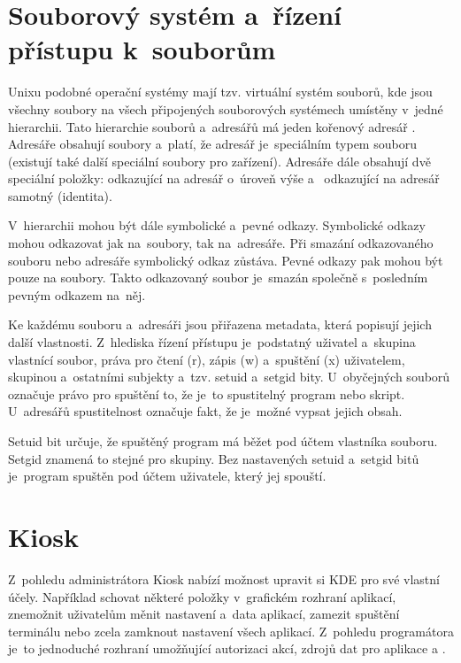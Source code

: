 \section{Souborový systém a~řízení přístupu k~souborům}
Unixu podobné operační systémy mají tzv. virtuální systém souborů, kde jsou všechny soubory na všech připojených souborových systémech umístěny v~jedné hierarchii. Tato hierarchie souborů a~adresářů má jeden kořenový adresář \uv{/}. Adresáře obsahují soubory a~platí, že adresář je~speciálním typem souboru (existují také další speciální soubory pro zařízení). Adresáře dále obsahují dvě speciální položky:  odkazující na adresář o~úroveň výše a~ odkazující na adresář samotný (identita).

V~hierarchii mohou být dále symbolické a~pevné odkazy. Symbolické odkazy mohou odkazovat jak na~soubory, tak na~adresáře. Při smazání odkazovaného souboru nebo adresáře symbolický odkaz zůstáva. Pevné odkazy pak mohou být pouze na soubory. Takto odkazovaný soubor je~smazán společně s~posledním pevným odkazem na~něj.

Ke každému souboru a~adresáři jsou přiřazena metadata, která popisují jejich další vlastnosti. Z~hlediska řízení přístupu je~podstatný uživatel a~skupina vlastnící soubor, práva pro čtení (r), zápis (w) a~spuštění (x) uživatelem, skupinou a~ostatními subjekty a~tzv. setuid a~setgid bity. U~obyčejných souborů označuje právo pro spuštění to, že je~to spustitelný program nebo skript. U~adresářů spustitelnost označuje fakt, že je~možné vypsat jejich obsah.\cite{secureProg, OSP}

Setuid bit určuje, že spuštěný program má běžet pod účtem vlastníka souboru. Setgid znamená to stejné pro skupiny. Bez nastavených setuid a~setgid bitů je~program spuštěn pod účtem uživatele, který jej spouští.\cite{secureProg}


\section{Kiosk}
Z~pohledu administrátora Kiosk nabízí možnost upravit si KDE pro své vlastní účely. Například schovat některé položky v~grafickém rozhraní aplikací, znemožnit uživatelům měnit nastavení a~data aplikací, zamezit spuštění terminálu nebo zcela zamknout nastavení všech aplikací. Z~pohledu programátora je~to jednoduché rozhraní umožňující autorizaci akcí, zdrojů dat pro aplikace a .

